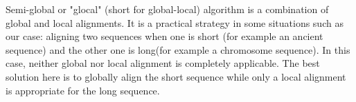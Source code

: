 \documentclass[11pt,a4paper]{report}
\begin{document}
Semi-global or "glocal" (short for global-local) algorithm is a combination of global and local alignments. It is a practical strategy in some situations such as our case: aligning two sequences when one is short (for example an ancient sequence) and the other one is long(for example a chromosome sequence). In this case, neither global nor local alignment is completely applicable. The best solution here is to globally align the short sequence while only a local alignment is appropriate for the long sequence.



\end{document}
